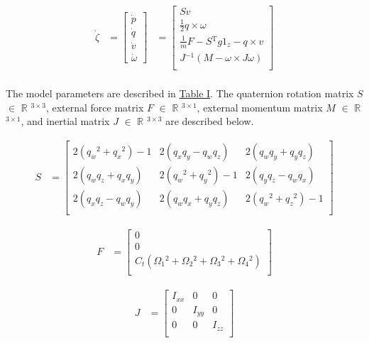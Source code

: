 \documentclass[conference]{IEEEtran}
\begin{document}
\begin{align*}
\dot{\zeta} &= \begin{bmatrix}
	\dot{p} \\
	\dot{q}\\
	\dot{v}\\
	\dot{\omega}
\end{bmatrix} &=
\begin{bmatrix}
    Sv \\
    \frac{1}{2}q\times \omega\\
    \frac{1}{m}F - S\mathrm{^{T}}g1_z - q \times v\\ 
    J\mathrm{^{-1}}(M - \omega \times J \omega)\\
\end{bmatrix}\\
\end{align*}
 
The model parameters are described in \hyperref[table1]{Table I}. The quaternion rotation matrix $S$ $\in$ $\mathbb{R}$ $\mathrm{^{3\times3}}$, external force matrix $F$ $\in$ $\mathbb{R}$ $\mathrm{^{3\times1}}$, external momentum matrix $M$ $\in$ $\mathbb{R}$ $\mathrm{^{3\times1}}$, and inertial matrix $J$ $\in$ $\mathbb{R}$ $\mathrm{^{3\times3}}$ are described below.\\
\hfill\break

\begin{align*}
	S &=
	\begin{bmatrix}
		2(q_w \mathrm{^{2}} + q_x \mathrm{^{2}}) - 1 & 
		2(q_x q_y - q_w q_z) & 
		2(q_w q_y + q_y q_z) \\
		2(q_w q_z + q_x q_y) &
		2(q_w \mathrm{^{2}} + q_y \mathrm{^{2}}) - 1 & 
		2(q_y q_z - q_w q_x) \\
		2(q_x q_z - q_w q_y) & 
		2(q_w q_x + q_y q_z) & 
		2(q_w \mathrm{^{2}} + q_z \mathrm{^{2}}) - 1\\
	\end{bmatrix}
\end{align*}
\hfill\break

\begin{align*}
	F &=
	\begin{bmatrix}
		0 \\
		0 \\
		C_t(\Omega_1\mathrm{^{2}} + \Omega_2\mathrm{^{2}} + \Omega_3\mathrm{^{2}} + \Omega_4\mathrm{^{2}})\\ 
	\end{bmatrix}
\end{align*}
\hfill\break

\begin{align*}
	J &=   
	\begin{bmatrix}
		I_{xx} & 0 & 0\\
		0 & I_{yy} & 0\\
		0 & 0 & I_{zz}\\ 
	\end{bmatrix}
\end{align*}
\hfill\break
\end{document}
